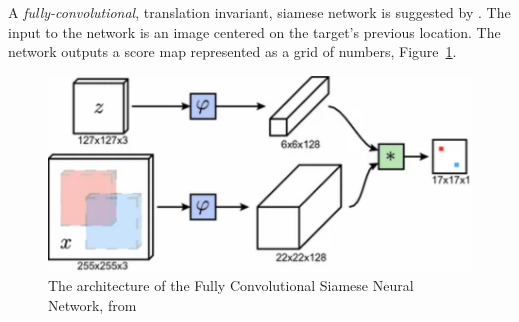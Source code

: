   A \textit{fully-convolutional}, translation invariant, siamese network is suggested by \citeauthor{bertinetto2016}.
  The input to the network is an image centered on the target's previous location.
  The network outputs a score map represented as a grid of numbers, Figure~\ref{fig:convSiamese}.

  \begin{figure}[!ht]
    \centering
    \includegraphics[scale = 0.6]{convSiamese.pdf}
    \caption{The architecture of the Fully Convolutional Siamese Neural Network, from \protect\cite{bertinetto2016}}
    \label{fig:convSiamese}
  \end{figure}

